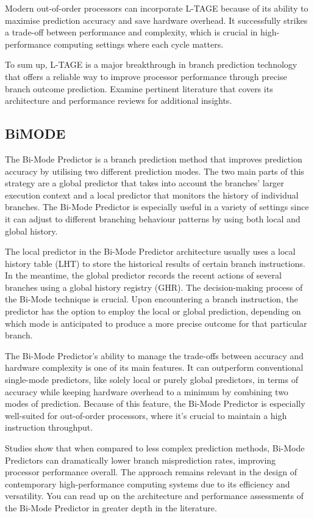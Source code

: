 \documentclass[10pt,journal,compsoc]{IEEEtran}
\begin{document}
Modern out-of-order processors can incorporate L-TAGE because of its ability to maximise prediction accuracy and save hardware overhead. It successfully strikes a trade-off between performance and complexity, which is crucial in high-performance computing settings where each cycle matters.

To sum up, L-TAGE is a major breakthrough in branch prediction technology that offers a reliable way to improve processor performance through precise branch outcome prediction. Examine pertinent literature that covers its architecture and performance reviews for additional insights.
\subsection{BiMODE}
\noindent The Bi-Mode Predictor is a branch prediction method that improves prediction accuracy by utilising two different prediction modes. The two main parts of this strategy are a global predictor that takes into account the branches' larger execution context and a local predictor that monitors the history of individual branches. The Bi-Mode Predictor is especially useful in a variety of settings since it can adjust to different branching behaviour patterns by using both local and global history.

The local predictor in the Bi-Mode Predictor architecture usually uses a local history table (LHT) to store the historical results of certain branch instructions. In the meantime, the global predictor records the recent actions of several branches using a global history registry (GHR). The decision-making process of the Bi-Mode technique is crucial. Upon encountering a branch instruction, the predictor has the option to employ the local or global prediction, depending on which mode is anticipated to produce a more precise outcome for that particular branch.

The Bi-Mode Predictor's ability to manage the trade-offs between accuracy and hardware complexity is one of its main features. It can outperform conventional single-mode predictors, like solely local or purely global predictors, in terms of accuracy while keeping hardware overhead to a minimum by combining two modes of prediction. Because of this feature, the Bi-Mode Predictor is especially well-suited for out-of-order processors, where it's crucial to maintain a high instruction throughput.

Studies show that when compared to less complex prediction methods, Bi-Mode Predictors can dramatically lower branch misprediction rates, improving processor performance overall. The approach remains relevant in the design of contemporary high-performance computing systems due to its efficiency and versatility. You can read up on the architecture and performance assessments of the Bi-Mode Predictor in greater depth in the literature.
\end{document}
